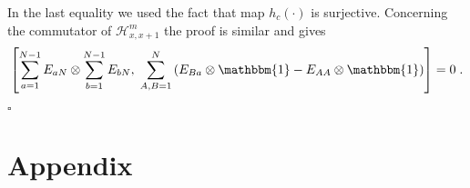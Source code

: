 \documentclass[10pt]{article}
\numberwithin{equation}{section}
\numberwithin{equation}{subsection}
\newcommand{\dt}{\;.}
\begin{document}
In the last equality we used the fact that map $h_{c}(\cdot)$ is surjective. 
Concerning the commutator of $\mathcal{H}_{x,x+1}^{m}$ the proof is similar and gives
\begin{equation}
	\left[\sum_{a=1}^{N-1}E_{aN}\otimes \sum_{b=1}^{N-1}E_{bN},\;\sum_{A,B=1}^{N}\left(E_{B a}\otimes \mathbbm{1}-E_{AA}\otimes \mathbbm{1}\right)\right]=0\dt
\end{equation} 
\begin{flushright}
	$\square$
\end{flushright}













\appendix 
\section*{Appendix}
\end{document}
